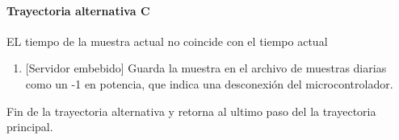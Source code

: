 \paragraph{Trayectoria alternativa C} \label{SUB-M-CU1.9:TC}
	EL tiempo de la muestra actual no coincide con el tiempo actual
	\begin{enumerate}[label=C\arabic*.]
		\item {[Servidor embebido]} Guarda la muestra en el archivo de muestras diarias como un -1 en potencia, que indica una desconexión del microcontrolador.
	\end{enumerate}
	Fin de la trayectoria alternativa y retorna al ultimo paso del la trayectoria principal.